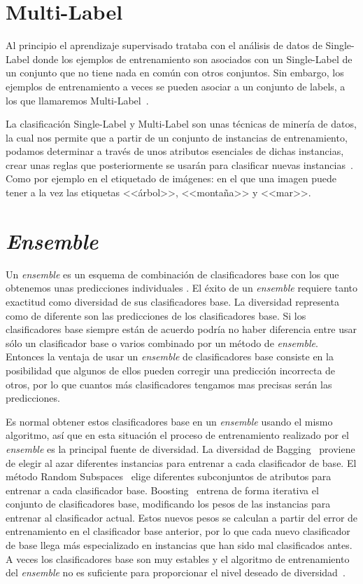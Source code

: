 \section{Multi-Label}
Al principio el aprendizaje supervisado trataba con el análisis de datos de Single-Label donde los ejemplos de entrenamiento son asociados con un Single-Label de un conjunto que no tiene nada en común con otros conjuntos. Sin embargo, los ejemplos de entrenamiento a veces se pueden asociar a un conjunto de labels, a los que llamaremos Multi-Label~\cite{multilabel2}.

La clasificación Single-Label y Multi-Label son unas técnicas de minería de datos, la cual nos permite que a partir de un conjunto de instancias de entrenamiento, podamos determinar a través de unos atributos esenciales de dichas instancias, crear unas reglas que posteriormente se usarán para clasificar nuevas instancias~\cite{multilabel}. Como por ejemplo en el etiquetado de imágenes: en el que una imagen puede tener a la vez las etiquetas <<árbol>>, <<montaña>> y <<mar>>.   

\section{\textit{Ensemble}}
Un \textit{ensemble} es un esquema de combinación de clasificadores base con los que obtenemos unas predicciones individuales . El éxito de un \textit{ensemble} requiere tanto exactitud como diversidad de sus clasificadores base. La diversidad representa como de diferente son las predicciones de los clasificadores base. Si los clasificadores base siempre están de acuerdo podría no haber diferencia entre usar sólo un clasificador base o varios combinado por un método de \textit{ensemble}. Entonces la ventaja de usar un \textit{ensemble} de clasificadores base consiste en la posibilidad que algunos de ellos pueden corregir una predicción incorrecta de otros, por lo que cuantos más clasificadores tengamos mas precisas serán las predicciones. 

Es normal obtener estos clasificadores base en un \textit{ensemble} usando el mismo algoritmo, así que en esta situación el proceso de entrenamiento realizado por el \textit{ensemble} es la principal fuente de diversidad. La diversidad de Bagging~\cite{bagging} proviene de elegir al azar diferentes instancias para entrenar a cada clasificador de base. El método Random Subspaces~\cite{randomsubspace} elige diferentes subconjuntos de atributos para entrenar a cada clasificador base. Boosting~\cite{boosting} entrena de forma iterativa el conjunto de clasificadores base, modificando los pesos de las instancias para entrenar al clasificador actual. Estos nuevos pesos se calculan a partir del error de entrenamiento en el clasificador base anterior, por lo que cada nuevo clasificador de base llega más especializado en instancias que han sido mal clasificados antes. A veces los clasificadores base son muy estables y el  algoritmo de entrenamiento del \textit{ensemble} no es suficiente para proporcionar el nivel deseado de diversidad~\cite{disturbingneighbors}.

